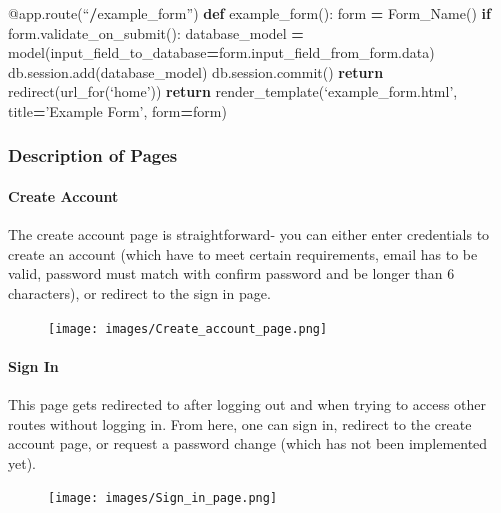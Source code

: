 \documentclass[]{book}
\newenvironment{Shaded}{\begin{snugshade}}{\end{snugshade}}
\newcommand{\KeywordTok}[1]{\textcolor[rgb]{0.13,0.29,0.53}{\textbf{#1}}}
\newcommand{\ControlFlowTok}[1]{\textcolor[rgb]{0.13,0.29,0.53}{\textbf{#1}}}
\newcommand{\OperatorTok}[1]{\textcolor[rgb]{0.81,0.36,0.00}{\textbf{#1}}}
\newcommand{\AttributeTok}[1]{\textcolor[rgb]{0.77,0.63,0.00}{#1}}
\newcommand{\NormalTok}[1]{#1}
\let\oldparagraph\paragraph
\renewcommand{\paragraph}[1]{\oldparagraph{#1}\mbox{}}
\begin{document}
\begin{Shaded}
\begin{Highlighting}[]
\AttributeTok{@app.route}\NormalTok{(“}\OperatorTok{/}\NormalTok{example_form”)}
\KeywordTok{def}\NormalTok{ example_form():}
\NormalTok{form }\OperatorTok{=}\NormalTok{ Form_Name()}
\ControlFlowTok{if}\NormalTok{ form.validate_on_submit():}
\NormalTok{              database_model }\OperatorTok{=}\NormalTok{ model(input_field_to_database}\OperatorTok{=}\NormalTok{form.input_field_from_form.data)}
\NormalTok{              db.session.add(database_model)}
\NormalTok{              db.session.commit()}
              \ControlFlowTok{return}\NormalTok{ redirect(url_for(‘home’))}
\ControlFlowTok{return}\NormalTok{ render_template(‘example_form.html’, title}\OperatorTok{=}\NormalTok{’Example Form’, form}\OperatorTok{=}\NormalTok{form)}
\end{Highlighting}
\end{Shaded}

\subsubsection{Description of Pages}\label{description-of-pages}

\paragraph{Create Account}\label{create-account}

The create account page is straightforward- you can either enter
credentials to create an account (which have to meet certain
requirements, email has to be valid, password must match with confirm
password and be longer than 6 characters), or redirect to the sign in
page.

\begin{figure}
\centering
\texttt{[image: images/Create\_account\_page.png]}
\caption{}
\end{figure}

\paragraph{Sign In}\label{sign-in}

This page gets redirected to after logging out and when trying to access
other routes without logging in. From here, one can sign in, redirect to
the create account page, or request a password change (which has not
been implemented yet).

\begin{figure}
\centering
\texttt{[image: images/Sign\_in\_page.png]}
\caption{}
\end{figure}
\end{document}
